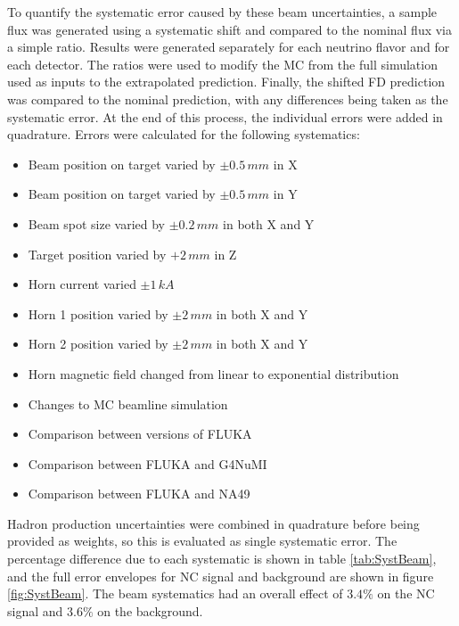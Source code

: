 To quantify the systematic error caused by these beam uncertainties, a sample flux was generated using a systematic shift and compared to the nominal flux via a simple ratio. Results were generated separately for each neutrino flavor and for each detector. The ratios were used to modify the MC from the full simulation used as inputs to the extrapolated prediction. Finally, the shifted FD prediction was compared to the nominal prediction, with any differences being taken as the systematic error. At the end of this process, the individual errors were added in quadrature. Errors were calculated for the following systematics:
\begin{singlespace}
\begin{itemize}
  \item Beam position on target varied by $\pm 0.5\,mm$ in X
  \item Beam position on target varied by $\pm 0.5\,mm$ in Y
  \item Beam spot size varied by $\pm 0.2\,mm$ in both X and Y
  \item Target position varied by $+ 2\, mm$ in Z
  \item Horn current varied $\pm 1\,kA$
  \item Horn 1 position varied by $\pm 2\,mm$ in both X and Y
  \item Horn 2 position varied by $\pm 2\,mm$ in both X and Y
  \item Horn magnetic field changed from linear to exponential distribution
  \item Changes to MC beamline simulation
  \item Comparison between versions of FLUKA
  \item Comparison between FLUKA and G4NuMI
  \item Comparison between FLUKA and NA49
\end{itemize}
\end{singlespace}
\n Hadron production uncertainties were combined in quadrature before being provided as weights, so this is evaluated as single systematic error. The percentage difference due to each systematic is shown in table \ref{tab:SystBeam}, and the full error envelopes for NC signal and background are shown in figure \ref{fig:SystBeam}. The beam systematics had an overall effect of $3.4\%$ on the NC signal and $3.6\%$ on the background.
